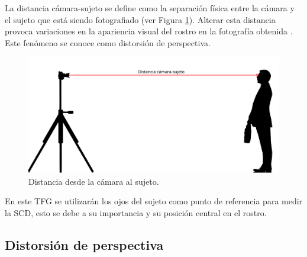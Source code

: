 La distancia cámara-sujeto se define como la separación física entre la cámara y el sujeto que está siendo fotografiado (ver Figura \ref{fig9}). Alterar esta distancia provoca variaciones en la apariencia visual del rostro en la fotografía obtenida \cite{43}. Este fenómeno se conoce como distorsión de perspectiva.


\begin{figure}[h]
	\centering
	\includegraphics[scale=0.125]{imagenes/cap2/SCD_final.png}
	\caption{Distancia desde la cámara al sujeto.}
	\label{fig9}
\end{figure}

En este TFG se utilizarán los ojos del sujeto como punto de referencia para medir la SCD, esto se debe a su importancia y su posición central en el rostro.

	
\subsection*{Distorsión de perspectiva}

